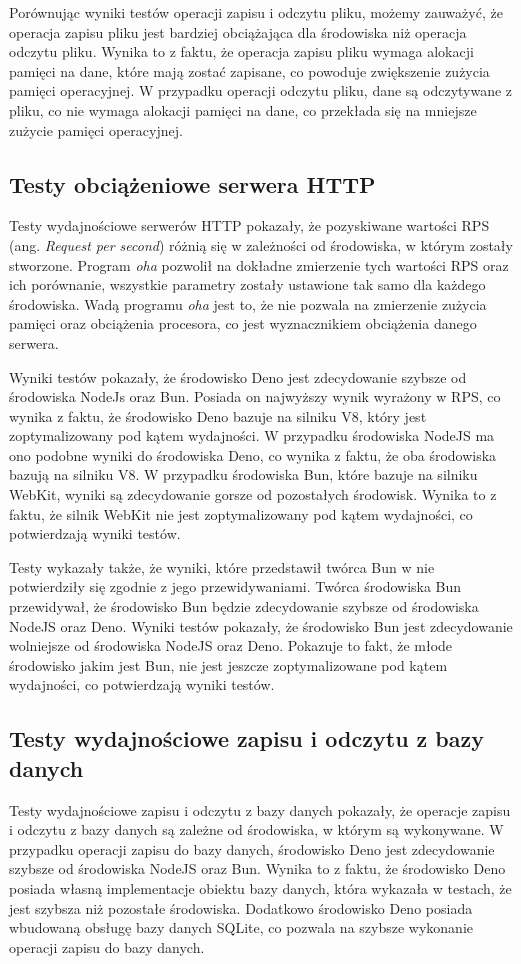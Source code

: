 Porównując wyniki testów operacji zapisu i odczytu pliku, możemy zauważyć, że operacja zapisu pliku jest bardziej obciążająca dla środowiska niż operacja odczytu pliku. Wynika to z faktu, że operacja zapisu pliku wymaga alokacji pamięci na dane, które mają zostać zapisane, co powoduje zwiększenie zużycia pamięci operacyjnej. W przypadku operacji odczytu pliku, dane są odczytywane z pliku, co nie wymaga alokacji pamięci na dane, co przekłada się na mniejsze zużycie pamięci operacyjnej.

\subsection{Testy obciążeniowe serwera HTTP}
Testy wydajnościowe serwerów HTTP pokazały, że pozyskiwane wartości RPS (ang. \textit{Request per second}) różnią się w zależności od środowiska, w którym zostały stworzone. Program \textit{oha} \cite{oha} pozwolił na dokładne zmierzenie tych wartości RPS oraz ich porównanie, wszystkie parametry zostały ustawione tak samo dla każdego środowiska. Wadą programu \textit{oha} jest to, że nie pozwala na zmierzenie zużycia pamięci oraz obciążenia procesora, co jest wyznacznikiem obciążenia danego serwera.

Wyniki testów pokazały, że środowisko Deno jest zdecydowanie szybsze od środowiska NodeJs oraz Bun. Posiada on najwyższy wynik wyrażony w RPS, co wynika z faktu, że środowisko Deno bazuje na silniku V8, który jest zoptymalizowany pod kątem wydajności. W przypadku środowiska NodeJS ma ono podobne wyniki do środowiska Deno, co wynika z faktu, że oba środowiska bazują na silniku V8. W przypadku środowiska Bun, które bazuje na silniku WebKit, wyniki są zdecydowanie gorsze od pozostałych środowisk. Wynika to z faktu, że silnik WebKit nie jest zoptymalizowany pod kątem wydajności, co potwierdzają wyniki testów.

Testy wykazały także, że wyniki, które przedstawił twórca Bun w \cite{bun_test} nie potwierdziły się zgodnie z jego przewidywaniami. Twórca środowiska Bun przewidywał, że środowisko Bun będzie zdecydowanie szybsze od środowiska NodeJS oraz Deno. Wyniki testów pokazały, że środowisko Bun jest zdecydowanie wolniejsze od środowiska NodeJS oraz Deno. Pokazuje to fakt, że młode środowisko jakim jest Bun, nie jest jeszcze zoptymalizowane pod kątem wydajności, co potwierdzają wyniki testów.

\subsection{Testy wydajnościowe zapisu i odczytu z bazy danych}
Testy wydajnościowe zapisu i odczytu z bazy danych pokazały, że operacje zapisu i odczytu z bazy danych są zależne od środowiska, w którym są wykonywane. W przypadku operacji zapisu do bazy danych, środowisko Deno jest zdecydowanie szybsze od środowiska NodeJS oraz Bun. Wynika to z faktu, że środowisko Deno posiada własną implementacje obiektu bazy danych, która wykazała w testach, że jest szybsza niż pozostałe środowiska. Dodatkowo środowisko Deno posiada wbudowaną obsługę bazy danych SQLite, co pozwala na szybsze wykonanie operacji zapisu do bazy danych.


